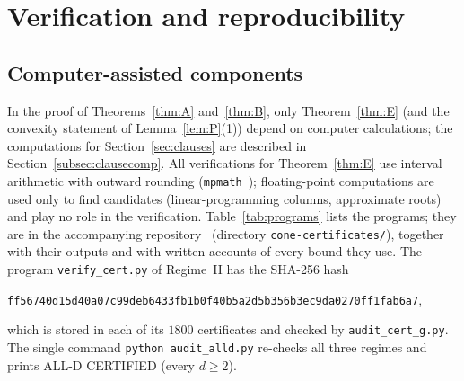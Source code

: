 \documentclass[11pt]{amsart}
\theoremstyle{definition}
\theoremstyle{remark}
\numberwithin{equation}{section}
\begin{document}
\section{Verification and reproducibility}\label{sec:verification}

\subsection{Computer-assisted components}
In the proof of Theorems~\ref{thm:A} and~\ref{thm:B}, only Theorem~\ref{thm:E} (and the convexity statement of
Lemma~\ref{lem:P}(1)) depend on computer calculations; the computations for Section~\ref{sec:clauses} are described in
Section~\ref{subsec:clausecomp}. All verifications for Theorem~\ref{thm:E} use interval arithmetic with outward
rounding (\texttt{mpmath}~\cite{mpmath}); floating-point computations
are used only to find candidates (linear-programming columns, approximate roots) and play no role in the verification.
Table~\ref{tab:programs} lists the programs; they are in the accompanying repository~\cite{repo-oqp27} (directory
\texttt{cone-certificates/}), together with their outputs and with written accounts of every bound they use. The
program \texttt{verify\_cert.py} of Regime~II has the SHA-256 hash
\begin{center}
\small\texttt{ff56740d15d40a07c99deb6433fb1b0f40b5a2d5b356b3ec9da0270ff1fab6a7},
\end{center}
which is stored in each of its $1800$ certificates and checked by \texttt{audit\_cert\_g.py}. The single command
\texttt{python audit\_alld.py} re-checks all three regimes and prints ALL-D CERTIFIED (every $d\ge2$).
\end{document}

